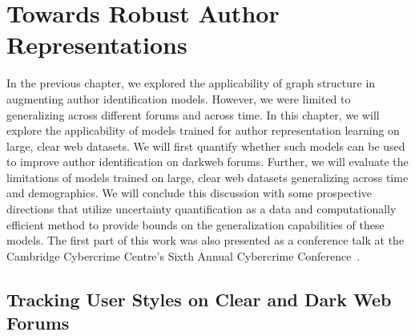 \chapter{Towards Robust Author Representations}
\label{chp:stylometry_extensions}

In the previous chapter, we explored the applicability of graph structure in augmenting author identification models. 
However, we were limited to generalizing across different forums and across time.
In this chapter, we will explore the applicability of models trained for author representation learning on large, clear web datasets.
We will first quantify whether such models can be used to improve author identification on darkweb forums.
Further, we will evaluate the limitations of models trained on large, clear web datasets  generalizing across time and demographics.
We will conclude this discussion with some prospective directions that utilize uncertainty quantification as a data and computationally efficient method to provide bounds on the generalization capabilities of these models.
The first part of this work was also presented as a conference talk at the Cambridge Cybercrime Centre's Sixth Annual Cybercrime Conference~\citep{maneriker2023following}.


\section{Tracking User Styles on Clear and Dark Web Forums}
\label{chp:stylometry_extensions:followingTrail}

